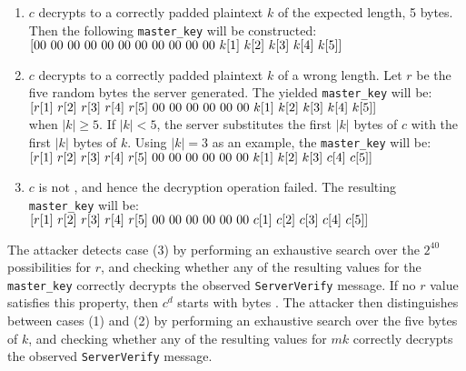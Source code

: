 \begin{enumerate}
\item $c$ decrypts to a correctly padded plaintext $k$ of the expected length, 5
	bytes. Then the following \texttt{master\_key} will be constructed:\smallskip\small\\
	$[00\ 00\ 00\ 00\ 00\ 00\ 00\ 00\ 00\ 00\ 00\ k\pos{1}\ k\pos{2}\ k\pos{3}\ k\pos{4}\ k\pos{5}]$
	\normalsize
\item $c$ decrypts to a correctly padded plaintext $k$ of a wrong length.
	Let $r$ be the five random bytes the server generated.
	The yielded \texttt{master\_key} will be:\smallskip\small\\
	\hspace*{-12pt}$[r\pos{1}\ r\pos{2}\ r\pos{3}\ r\pos{4}\ r\pos{5}\ 00\ 00\ 00\ 00\ 00\ 00\ k\pos{1}\ k\pos{2}\ k\pos{3}\ k\pos{4}\ k\pos{5}]$\medskip\\
	\normalsize
    when $|k| \ge 5$. If $|k| < 5$, the server substitutes the
	first $|k|$ bytes of $c$
	with the first $|k|$ bytes of $k$.
	Using $|k| = 3$ as an example, 
	the \texttt{master\_key} will be:\smallskip\small\\
	\hspace*{-12pt}$[r\pos{1}\ r\pos{2}\ r\pos{3}\ r\pos{4}\ r\pos{5}\ 00\ 00\ 00\ 00\ 00\ 00\ k\pos{1}\ k\pos{2}\ k\pos{3}\ c\pos{4}\ c\pos{5}]$\normalsize\vspace{-11pt}
\item $c$ is not \sslconform, and hence the decryption operation failed.
	The resulting \texttt{master\_key} will be:\medskip\small\\
	\hspace*{-12pt}$[r\pos{1}\ r\pos{2}\ r\pos{3}\ r\pos{4}\ r\pos{5}\ 00\ 00\ 00\ 00\ 00\ 00\ c\pos{1}\ c\pos{2}\ c\pos{3}\ c\pos{4}\ c\pos{5}]$
\end{enumerate}
The attacker detects case (3) by performing an exhaustive search over the
$2^{40}$ possibilities for $r$, and checking whether any of the resulting
values for the \texttt{master\_key} correctly decrypts the observed
\texttt{ServerVerify} message. If no $r$ value satisfies this property, then
$c^d$ starts with bytes . The attacker then distinguishes between
cases (1) and (2) by performing an exhaustive search over the five bytes of $k$,
and checking whether any of the resulting values for $mk$ correctly 
decrypts the observed \texttt{ServerVerify} message.


